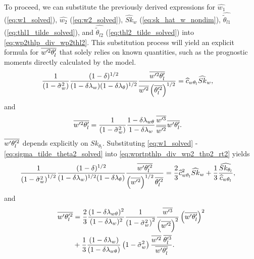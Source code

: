 To proceed, we can substitute the previously derived expressions for
$\widehat{w_1}$ (\cref{eq:w1_solved}), $\widehat{w_2}$ (\cref{eq:w2_solved}),
$\widehat{Sk}_w$ (\cref{eq:sk_hat_w_nondim}),
$\widehat{\tilde{\theta}_{l1}}$ (\cref{eq:thl1_tilde_solved}),
and $\widehat{\tilde{\theta}_{l2}}$ (\cref{eq:thl2_tilde_solved}) into \cref{eq:wp2thlp_div_wp2thl2}.
This substitution process will yield an explicit formula for $\overline{w'^2 \theta_l'}$ that solely relies on known quantities,
such as the prognostic moments directly calculated by the model.
\begin{align}
    \label{eq:wp2thlp_sk_w_solved}
    \frac{1}{\left( 1 - \tilde{\sigma}_w^2 \right)} \frac{(1-\delta)^{1/2}}{(1-\delta \lambda_w) (1-\delta \lambda_\theta)^{1/2}} \frac{\overline{w'^2\theta_l'}}{\overline{w'^2} \left(\overline{\theta_l'^2} \right)^{1/2}}
    &= \widehat{c}_{w\theta_l} \widehat{Sk}_w,
\end{align}
and
\begin{align}
    \label{eq:wp2thlp_solved}
    \overline{w'^2\theta_l'}
    &= \frac{1}{\left( 1 - \tilde{\sigma}_w^2 \right)} \frac{1 - \delta \lambda_{w\theta}}{1-\delta \lambda_w} \frac{\overline{w'^3}}{\overline{w'^2}} \overline{w'\theta_l'}.
\end{align}
$\overline{w' \theta_l'^2}$ depends explicitly on $Sk_{\theta_l}$.
Substituting \cref{eq:w1_solved} - \cref{eq:sigma_tilde_theta2_solved}
into \cref{eq:wprtpthlp_div_wp2_thp2_rt2} yields
\begin{align}
    \label{eq:wpthlp2_sk_w_solved}
    \frac{1}{\left( 1 - \tilde{\sigma}_w^2 \right)^{1/2}} \frac{(1-\delta)^{1/2}}{(1-\delta \lambda_w)^{1/2} (1-\delta \lambda_\theta)} \frac{\overline{w'\theta_l'^2}}{\left(\overline{w'^2}\right)^{1/2} \overline{\theta_l'^2}}
    &= \frac{2}{3} \widehat{c}_{w\theta_l}^2 \widehat{Sk}_w + \frac{1}{3} \frac{ \widehat{Sk_{\theta_l}} } {\widehat{c}_{w\theta_l}},
\end{align}
and
\begin{align}
    \label{eq:wpthlp2_solved}
    \overline{w'\theta_l'^2}
    &= \frac{2}{3} \frac{(1-\delta \lambda_{w \theta})^2}{(1-\delta \lambda_w)^2} \frac{1}{\left( 1 - \tilde{\sigma}_w^2 \right)^2} \frac{\overline{w'^3}}{\left(\overline{w'^2} \right)^2} \left(\overline{w'\theta_l'} \right)^2 \nonumber\\
    &+ \frac{1}{3} \frac{(1-\delta \lambda_w)}{(1-\delta \lambda_{w \theta})} \left( 1 - \tilde{\sigma}_w^2 \right) \frac{\overline{w'^2} \; \overline{\theta_l'^3} }{\overline{w'\theta_l'}}.
\end{align}

